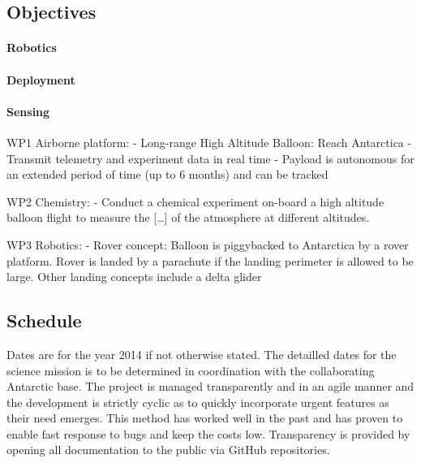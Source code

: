 \documentclass[a4paper,12pt]{article}
\begin{document}
\subsection{Objectives}

\paragraph{Robotics}

\paragraph{Deployment}

\paragraph{Sensing}



WP1 Airborne platform:
- Long-range High Altitude Balloon: Reach Antarctica
- Transmit telemetry and experiment data in real time
- Payload is autonomous for an extended period of time (up to 6 months) and can be tracked

WP2 Chemistry:
- Conduct a chemical experiment on-board a high altitude balloon flight to measure the […] of the atmosphere at different altitudes.

WP3 Robotics:
- Rover concept: Balloon is piggybacked to Antarctica by a rover platform. Rover is landed by a parachute if the landing perimeter is allowed to be large. Other landing concepts include a delta glider 



\subsection{Schedule}

Dates are for the year 2014 if not otherwise stated. The detailled dates for the science mission is to be determined in coordination with the collaborating Antarctic base. The project is managed transparently and in an agile manner and the development is strictly cyclic as to quickly incorporate urgent features as their need emerges. This method has worked well in the past and has proven to enable fast response to bugs and keep the costs low. Transparency is provided by opening all documentation to the public via GitHub \cite{octanisgithub} repositories. 
\end{document}

